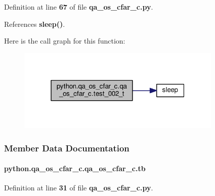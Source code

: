 Definition at line {\bf 67} of file {\bf qa\+\_\+os\+\_\+cfar\+\_\+c.\+py}.



References {\bf sleep()}.



Here is the call graph for this function\+:
\nopagebreak
\begin{figure}[H]
\begin{center}
\leavevmode
\includegraphics[width=277pt]{df/d72/classpython_1_1qa__os__cfar__c_1_1qa__os__cfar__c_a5441817cd5ba762799a859bf48770617_cgraph}
\end{center}
\end{figure}




\subsubsection{Member Data Documentation}
\paragraph[{tb}]{\setlength{\rightskip}{0pt plus 5cm}python.\+qa\+\_\+os\+\_\+cfar\+\_\+c.\+qa\+\_\+os\+\_\+cfar\+\_\+c.\+tb}\label{classpython_1_1qa__os__cfar__c_1_1qa__os__cfar__c_a05cd712f7601e85a2e95942a1f3c66ae}


Definition at line {\bf 31} of file {\bf qa\+\_\+os\+\_\+cfar\+\_\+c.\+py}.



